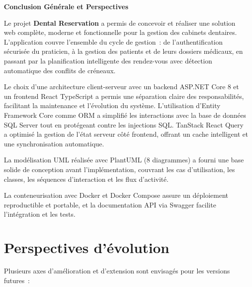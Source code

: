 \clearpage
\thispagestyle{plain}

\vspace*{2cm}

\begin{center}
{\fontsize{24}{29}\selectfont\bfseries Conclusion Générale et Perspectives}
\end{center}

\vspace{1.5cm}

Le projet \textbf{Dental Reservation} a permis de concevoir et réaliser une solution web complète, moderne et fonctionnelle pour la gestion des cabinets dentaires. L'application couvre l'ensemble du cycle de gestion~: de l'authentification sécurisée du praticien, à la gestion des patients et de leurs dossiers médicaux, en passant par la planification intelligente des rendez-vous avec détection automatique des conflits de créneaux.

Le choix d'une architecture client-serveur avec un backend ASP.NET Core 8 et un frontend React TypeScript a permis une séparation claire des responsabilités, facilitant la maintenance et l'évolution du système. L'utilisation d'Entity Framework Core comme ORM a simplifié les interactions avec la base de données SQL Server tout en protégeant contre les injections SQL. TanStack React Query a optimisé la gestion de l'état serveur côté frontend, offrant un cache intelligent et une synchronisation automatique.

La modélisation UML réalisée avec PlantUML (8 diagrammes) a fourni une base solide de conception avant l'implémentation, couvrant les cas d'utilisation, les classes, les séquences d'interaction et les flux d'activité.

La conteneurisation avec Docker et Docker Compose assure un déploiement reproductible et portable, et la documentation API via Swagger facilite l'intégration et les tests.

\section*{Perspectives d'évolution}

Plusieurs axes d'amélioration et d'extension sont envisagés pour les versions futures~:

